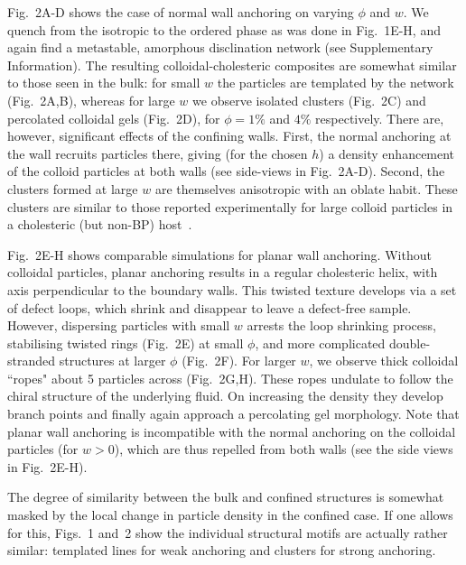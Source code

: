 \documentclass[12pt]{article}
\begin{document}
Fig.~2A-D shows the case of normal wall anchoring on varying $\phi$ and $w$. We quench from the isotropic to the ordered phase as was done in Fig.~1E-H, and again find a metastable, amorphous disclination network (see Supplementary Information). The resulting colloidal-cholesteric composites are somewhat similar to those seen in the bulk: for small $w$ the particles are templated by the network (Fig.~2A,B), whereas for large $w$ we observe isolated clusters (Fig.~2C) and percolated colloidal gels (Fig.~2D), for $\phi = 1\%$ and $4\%$ respectively. There are, however, significant effects of the confining walls.
First, the normal anchoring at the wall recruits particles there,  giving (for the chosen $h$) a density enhancement of the colloid particles at both walls 
(see side-views in Fig.~2A-D). Second, the clusters formed at large $w$ are themselves anisotropic with an oblate habit. These clusters
are similar to those reported experimentally for large colloid particles in a
cholesteric (but non-BP) host~\cite{niek}.
 
Fig.~2E-H shows comparable simulations for planar wall anchoring. 
Without colloidal particles, planar anchoring results in a regular
cholesteric helix,
with axis perpendicular to the boundary walls. 
This twisted texture develops via a set of defect loops,
which shrink and disappear to leave a defect-free sample. However,
dispersing particles with small $w$ arrests the loop shrinking process,
stabilising twisted rings (Fig.~2E) at small $\phi$, and more complicated 
double-stranded structures at larger $\phi$ (Fig.~2F).
For larger $w$, we observe thick colloidal ``ropes" about 5 particles across
(Fig.~2G,H). These ropes undulate to follow the chiral structure of the 
underlying fluid. On increasing the density they develop branch points and finally again approach a percolating gel morphology. Note that planar wall anchoring is incompatible with the normal anchoring on the colloidal particles (for $w>0$), which are thus repelled from both walls (see the side views in Fig.~2E-H).

The degree of similarity between
the bulk and confined structures is somewhat masked by the local
change in particle density in the confined case. If one allows for
this, Figs.~1 and~2 show the individual structural motifs are actually
rather similar: templated lines for weak anchoring and clusters for
strong anchoring.
\end{document}
